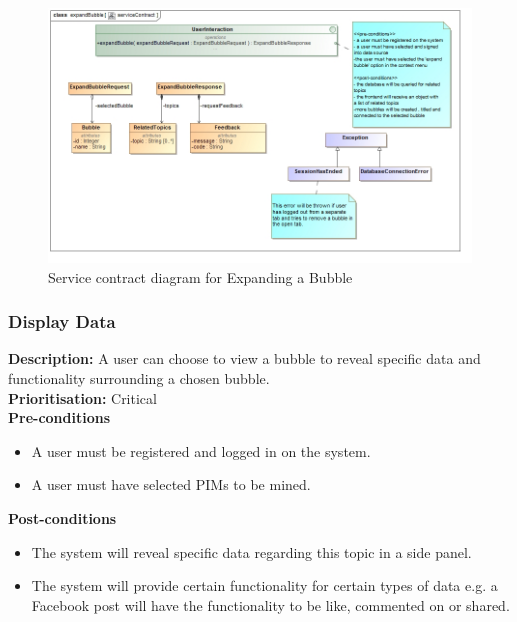 \documentclass[hidelinks,english]{article}
\begin{document}
    			\begin{figure}[!h]
    			\includegraphics[width=\linewidth]{serviceContractExpandBubble.jpg}
    			\caption{Service contract diagram for Expanding a Bubble}
    			\label{ServiceContractExpandBubble}
    			\end{figure}
			    
    		\subsubsection{Display Data}
				\textbf{Description:}  A user can choose to view a bubble to reveal specific data and functionality surrounding a chosen bubble.\\
			    \textbf{Prioritisation:} Critical\\
			    \textbf{Pre-conditions}
			    \begin{itemize}
			        \item A user must be registered and logged in on the system.
			        \item A user must have selected PIMs to be mined.
			    \end{itemize}
				\textbf{Post-conditions}
				\begin{itemize}
					\item The system will reveal specific data regarding this topic in a side panel.
					\item The system will provide certain functionality for certain types of data e.g. a Facebook post will have the functionality to be like, commented on or shared.
				\end{itemize}
				
\end{document}
